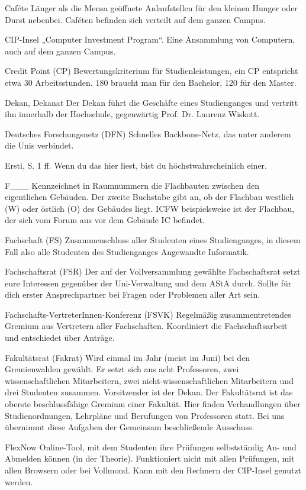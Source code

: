 Caféte
Länger als die Mensa geöffnete Anlaufstellen für den kleinen Hunger oder Durst nebenbei. Caféten befinden sich verteilt auf dem ganzen Campus.

CIP-Insel
„Computer Investment Program“. Eine Ansammlung von Computern, auch auf dem ganzen Campus.

Credit Point (CP)
Bewertungskriterium für Studienleistungen, ein CP entspricht etwa 30 Arbeitsstunden. 180 braucht man für den Bachelor, 120 für den Master.

Dekan, Dekanat
Der Dekan führt die Geschäfte eines Studienganges und vertritt ihn innerhalb der Hochschule, gegenwärtig Prof. Dr. Laurenz Wiskott.

Deutsches Forschungsnetz (DFN)
Schnelles Backbone-Netz, das unter anderem die Unis verbindet.

Ersti, S. 1 ff.
Wenn du das hier liest, bist du höchstwahrscheinlich einer.

F___
Kennzeichnet in Raumnummern die Flachbauten zwischen den eigentlichen Gebäuden. Der zweite Buchstabe gibt an, ob der Flachbau westlich (W) oder östlich (O) des Gebäudes liegt. ICFW beispielsweise ist der Flachbau, der sich vom Forum aus vor dem Gebäude IC befindet.

Fachschaft (FS)
Zusammenschluss aller Studenten eines Studienganges, in diesem Fall also alle Studenten des Studienganges Angewandte Informatik.

Fachschaftsrat (FSR)
Der auf der Vollversammlung gewählte Fachschaftsrat setzt eure Interessen gegenüber der Uni-Verwaltung und dem AStA durch. Sollte für dich erster Ansprechpartner bei Fragen oder Problemen aller Art sein.

Fachschafts-VertreterInnen-Konferenz (FSVK)
Regelmäßig zusammentretendes Gremium aus Vertretern aller Fachschaften. Koordiniert die Fachschaftsarbeit und entschiedet über Anträge.

Fakultätsrat (Fakrat)
Wird einmal im Jahr (meist im Juni) bei den Gremienwahlen gewählt. Er setzt sich aus acht Professoren, zwei wissenschaftlichen Mitarbeitern, zwei nicht-wissenschaftlichen Mitarbeitern und drei Studenten zusammen. Vorsitzender ist der Dekan. Der Fakultätsrat ist das oberste beschlussfähige Gremium einer Fakultät. Hier finden Verhandlungen über Studienordnungen, Lehrpläne und Berufungen von Professoren statt. Bei uns übernimmt diese Aufgaben der Gemeinsam beschließende Ausschuss.

FlexNow
Online-Tool, mit dem Studenten ihre Prüfungen selbstständig An- und Abmelden können (in der Theorie). Funktioniert nicht mit allen Prüfungen, mit allen Browsern oder bei Vollmond. Kann mit den Rechnern der CIP-Insel genutzt werden.

